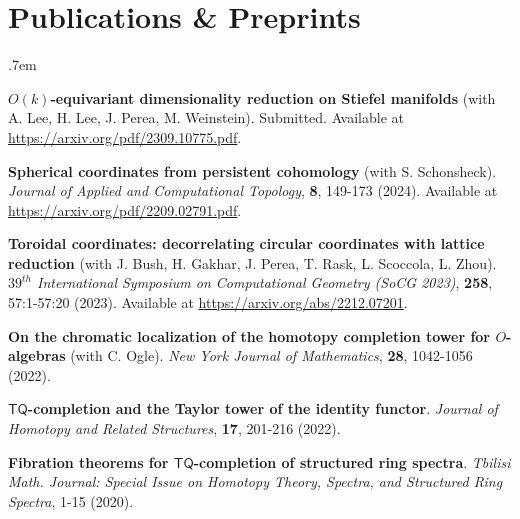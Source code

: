\documentclass[10pt,letterpaper]{article}
\renewenvironment{itemize}{
  \begin{list}{}{
    \setlength{\leftmargin}{1.5em}
    \setlength{\itemsep}{0.25em}
    \setlength{\parskip}{0pt}
    \setlength{\parsep}{0.25em}
  }
}{
  \end{list}
}
\begin{document}
\section*{Publications \& Preprints}

\begin{itemize}\itemsep.7em

\item{\bf $O(k)$-equivariant dimensionality reduction on Stiefel manifolds} (with A. Lee, H. Lee, J. Perea, M. Weinstein). Submitted. Available at \url{https://arxiv.org/pdf/2309.10775.pdf}.

\item {\bf Spherical coordinates from persistent cohomology} (with S. Schonsheck). \emph{Journal of Applied and Computational Topology}, \textbf{8}, 149-173 (2024). Available at \url{https://arxiv.org/pdf/2209.02791.pdf}.

\item{\bf Toroidal coordinates: decorrelating circular coordinates with lattice reduction} (with J. Bush, H. Gakhar, J. Perea, T. Rask, L. Scoccola, L. Zhou). \textit{$39^{th}$ International Symposium on Computational Geometry (SoCG 2023)}, \textbf{258},  57:1-57:20 (2023). Available at \url{https://arxiv.org/abs/2212.07201}.

\item{\bf On the chromatic localization of the homotopy completion tower for $O$-algebras} (with C. Ogle). \textit{New York Journal of Mathematics}, {\bf 28}, 1042-1056 (2022). 



\item{\bf $\mathsf{TQ}$-completion and the Taylor tower of the identity functor}. \textit{Journal of Homotopy and Related Structures}, \textbf{17}, 201-216 (2022). 



\item {\bf Fibration theorems for $\mathsf{TQ}$-completion of structured ring spectra}. \textit{Tbilisi Math. Journal: Special Issue on Homotopy Theory, Spectra, and Structured Ring Spectra}, 1-15 (2020). 



\end{itemize}
\end{document}
